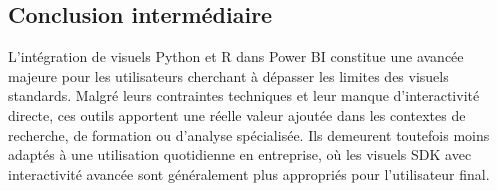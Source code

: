 \subsection*{Conclusion intermédiaire}

L’intégration de visuels Python et R dans Power BI constitue une avancée majeure pour les utilisateurs cherchant à dépasser les limites des visuels standards. Malgré leurs contraintes techniques et leur manque d’interactivité directe, ces outils apportent une réelle valeur ajoutée dans les contextes de recherche, de formation ou d'analyse spécialisée. Ils demeurent toutefois moins adaptés à une utilisation quotidienne en entreprise, où les visuels SDK avec interactivité avancée sont généralement plus appropriés pour l’utilisateur final.
